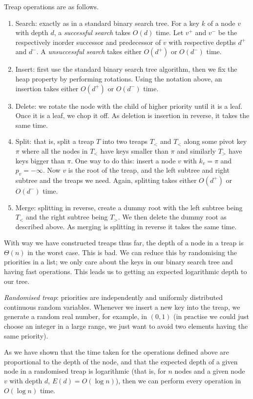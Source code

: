\documentclass[a4paper]{article}
\begin{document}
Treap operations are as follows.
\begin{enumerate}
	\item Search: exactly as in a standard binary search tree.
	For a key $k$ of a node $v$ with depth $d$, 
	a \emph{successful search} takes
	$O(d)$ time. Let $v^+$ and $v^-$ be the respectively inorder successor 
	and predecessor of $v$ with respective depths $d^+$ and $d^-$.
	A \emph{unsuccessful search} takes either $O(d^+)$ or $O(d^-)$ time.
	\item Insert: first use the standard binary search tree algorithm,
	then we fix the heap property by performing rotations.
	Using the notation above, an insertion takes
	either $O(d^+)$ or $O(d^-)$ time.
	\item Delete: we rotate the node with the child of higher priority
	until it is a leaf.
	Once it is a leaf, we chop it off.
	As deletion is insertion in reverse, it takes the same time.
	\item Split: that is, split a treap $T$ into two treaps $T_<$ and
	$T_<$ along some pivot key $\pi$
	where all the nodes in $T_<$ have keys smaller than $\pi$
	and similarly $T_>$ have keys bigger than $\pi$.
	One way to do this: insert a node $v$ with $k_v = \pi$ and
	$p_v = -\infty$.
	Now $v$ is the root of the treap, and the left subtree and
	right subtree and the treaps we need.
	Again, splitting takes either $O(d^+)$ or $O(d^-)$ time.
	\item Merge: splitting in reverse, create a dummy root
	with the left subtree being $T_<$ and the right subtree
	being $T_>$. We then delete the dummy root as described above.
	As merging is splitting in reverse it takes the same time.
\end{enumerate}

With way we have constructed treaps thus far, 
the depth of a node in a treap is $\Theta(n)$ in the worst case.
This is bad.
We can reduce this by randomising the priorities in a list;
we only care about the keys in our binary search tree and having
fast operations.
This leads us to getting an expected logarithmic depth to our tree.

\emph{Randomised treap}: priorities are independently and
uniformly distributed continuous random variables.
Whenever we insert a new key into the treap, we generate a random real
number, for example, in $(0,1)$
(in practise we could just choose an integer in a large range,
we just want to avoid two elements having the same priority).

As we have shown that the time taken for the operations defined above
are proportional to the depth of the node, and that the expected
depth of a given node in a randomised treap is logarithmic (that is,
for $n$ nodes and a given node $v$ with depth $d$, $E(d) = O(\log n)$),
then we can perform every operation in $O(\log n)$ time.
\end{document}
